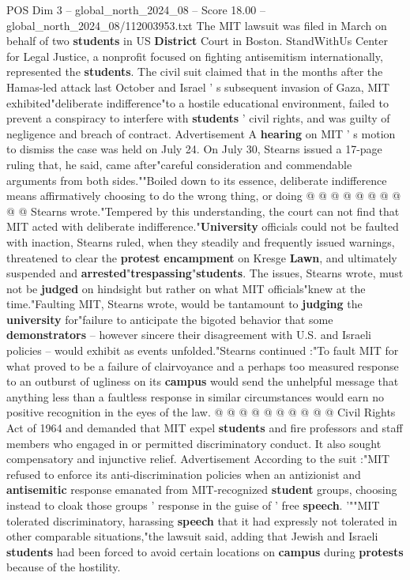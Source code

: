\begin{textsample}{POS Dim 3 – global\_north\_2024\_08 – Score 18.00 – global\_north\_2024\_08/112003953.txt}
The MIT lawsuit was filed in March on behalf of two \textbf{students} in US \textbf{District} Court in Boston.
StandWithUs Center for Legal Justice, a nonprofit focused on fighting antisemitism internationally, represented the \textbf{students}.
The civil suit claimed that in the months after the Hamas-led attack last October and Israel ' s subsequent invasion of Gaza, MIT exhibited"deliberate indifference"to a hostile educational environment, failed to prevent a conspiracy to interfere with \textbf{students} ' civil rights, and was guilty of negligence and breach of contract.
Advertisement A \textbf{hearing} on MIT ' s motion to dismiss the case was held on July 24.
On July 30, Stearns issued a 17-page ruling that, he said, came after"careful consideration and commendable arguments from both sides.""Boiled down to its essence, deliberate indifference means affirmatively choosing to do the wrong thing, or doing @ @ @ @ @ @ @ @ @ @ Stearns wrote."Tempered by this understanding, the court can not find that MIT acted with deliberate indifference."\textbf{University} officials could not be faulted with inaction, Stearns ruled, when they steadily and frequently issued warnings, threatened to clear the \textbf{protest} \textbf{encampment} on Kresge \textbf{Lawn}, and ultimately suspended and \textbf{arrested}"\textbf{trespassing}"\textbf{students}.
The issues, Stearns wrote, must not be \textbf{judged} on hindsight but rather on what MIT officials"knew at the time."Faulting MIT, Stearns wrote, would be tantamount to \textbf{judging} the \textbf{university} for"failure to anticipate the bigoted behavior that some \textbf{demonstrators} -- however sincere their disagreement with U.S. and Israeli policies -- would exhibit as events unfolded."Stearns continued :"To fault MIT for what proved to be a failure of clairvoyance and a perhaps too measured response to an outburst of ugliness on its \textbf{campus} would send the unhelpful message that anything less than a faultless response in similar circumstances would earn no positive recognition in the eyes of the law. @ @ @ @ @ @ @ @ @ @ Civil Rights Act of 1964 and demanded that MIT expel \textbf{students} and fire professors and staff members who engaged in or permitted discriminatory conduct.
It also sought compensatory and injunctive relief.
Advertisement According to the suit :"MIT refused to enforce its anti-discrimination policies when an antizionist and \textbf{antisemitic} response emanated from MIT-recognized \textbf{student} groups, choosing instead to cloak those groups ' response in the guise of ' free \textbf{speech}. '""MIT tolerated discriminatory, harassing \textbf{speech} that it had expressly not tolerated in other comparable situations,"the lawsuit said, adding that Jewish and Israeli \textbf{students} had been forced to avoid certain locations on \textbf{campus} during \textbf{protests} because of the hostility.

\end{textsample}

